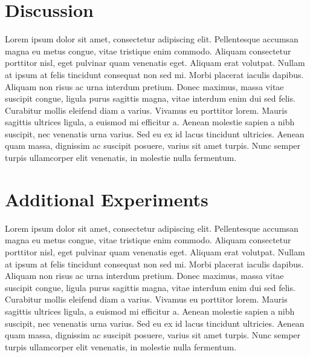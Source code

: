 \section{Discussion}

Lorem ipsum dolor sit amet, consectetur adipiscing elit. Pellentesque accumsan magna eu metus congue, vitae tristique enim commodo. Aliquam consectetur porttitor nisl, eget pulvinar quam venenatis eget. Aliquam erat volutpat. Nullam at ipsum at felis tincidunt consequat non sed mi. Morbi placerat iaculis dapibus. Aliquam non risus ac urna interdum pretium. Donec maximus, massa vitae suscipit congue, ligula purus sagittis magna, vitae interdum enim dui sed felis. Curabitur mollis eleifend diam a varius. Vivamus eu porttitor lorem. Mauris sagittis ultrices ligula, a euismod mi efficitur a. Aenean molestie sapien a nibh suscipit, nec venenatis urna varius. Sed eu ex id lacus tincidunt ultricies. Aenean quam massa, dignissim ac suscipit posuere, varius sit amet turpis. Nunc semper turpis ullamcorper elit venenatis, in molestie nulla fermentum.

\section{Additional Experiments}

Lorem ipsum dolor sit amet, consectetur adipiscing elit. Pellentesque accumsan magna eu metus congue, vitae tristique enim commodo. Aliquam consectetur porttitor nisl, eget pulvinar quam venenatis eget. Aliquam erat volutpat. Nullam at ipsum at felis tincidunt consequat non sed mi. Morbi placerat iaculis dapibus. Aliquam non risus ac urna interdum pretium. Donec maximus, massa vitae suscipit congue, ligula purus sagittis magna, vitae interdum enim dui sed felis. Curabitur mollis eleifend diam a varius. Vivamus eu porttitor lorem. Mauris sagittis ultrices ligula, a euismod mi efficitur a. Aenean molestie sapien a nibh suscipit, nec venenatis urna varius. Sed eu ex id lacus tincidunt ultricies. Aenean quam massa, dignissim ac suscipit posuere, varius sit amet turpis. Nunc semper turpis ullamcorper elit venenatis, in molestie nulla fermentum.
